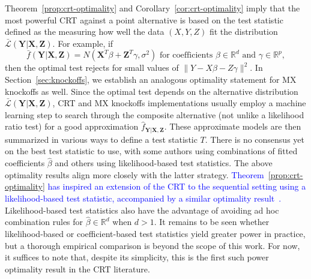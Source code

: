 \documentclass[ejs]{imsart}
\numberwithin{equation}{section}
\theoremstyle{plain}
\theoremstyle{definition}
\theoremstyle{remark}
\newcommand{\prx}{\bm X}
\newcommand{\srx}{X}
\newcommand{\prz}{\bm Z}
\newcommand{\srz}{Z}
\newcommand{\pry}{{\bm Y}}
\newcommand{\sry}{Y}
\begin{document}
Theorem~\ref{prop:crt-optimality} and Corollary~\ref{cor:crt-optimality} imply that the most powerful CRT against a point alternative is based on the test statistic defined as the measuring how well the data $(\srx, \sry, \srz)$ fit the distribution $\bar{\mathcal L}(\pry|\prx,\prz)$. For example, if
\begin{equation}
\bar f(\pry|\prx,\prz) = N(\prx^T\beta + \prz^T \gamma, \sigma^2) \text{ for coefficients } \beta \in \mathbb R^d \text{ and } \gamma \in \mathbb R^p,
\label{linear-model}
\end{equation}
then the optimal test rejects for small values of $\|\sry - \srx \beta - \srz \gamma \|^2$. In Section~\ref{sec:knockoffs}, we establish an analogous optimality statement for MX knockoffs as well. Since the optimal test depends on the alternative distribution $\bar{\mathcal L}(\pry|\prx,\prz)$, CRT and MX knockoffs implementations usually employ a machine learning step to search through the composite alternative (not unlike a likelihood ratio test) for a good approximation $\widehat f_{\pry|\prx,\prz}$. These approximate models are then summarized in various ways to define a test statistic $T$. There is no consensus yet on the best test statistic to use, with some authors \cite{CetL16, SetC17, SetS19} using combinations of fitted coefficients $\widehat \beta$ and others  \cite{Tansey2018, Bates2020} using likelihood-based test statistics. The above optimality results align more closely with the latter strategy. \textcolor{blue}{Theorem~\ref{prop:crt-optimality} has inspired an extension of the CRT to the sequential setting using a likelihood-based test statistic, accompanied by a similar optimality result~\cite{Grunwald2022}.} Likelihood-based test statistics also have the advantage of avoiding ad hoc combination rules for $\widehat \beta \in \mathbb R^d$ when $d > 1$. It remains to be seen whether likelihood-based or coefficient-based test statistics yield greater power in practice, but a thorough empirical comparison is beyond the scope of this work. For now, it suffices to note that, despite its simplicity, this is the first such power optimality result in the CRT literature.

\end{document}
